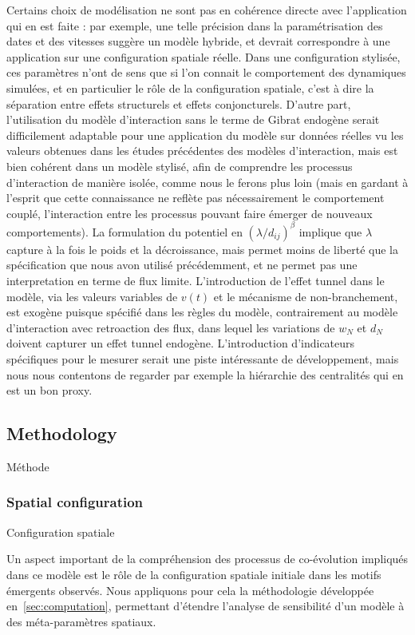 Certains choix de modélisation ne sont pas en cohérence directe avec l'application qui en est faite : par exemple, une telle précision dans la paramétrisation des dates et des vitesses suggère un modèle hybride, et devrait correspondre à une application sur une configuration spatiale réelle. Dans une configuration stylisée, ces paramètres n'ont de sens que si l'on connait le comportement des dynamiques simulées, et en particulier le rôle de la configuration spatiale, c'est à dire la séparation entre effets structurels et effets conjoncturels. D'autre part, l'utilisation du modèle d'interaction sans le terme de Gibrat endogène serait difficilement adaptable pour une application du modèle sur données réelles vu les valeurs obtenues dans les études précédentes des modèles d'interaction, mais est bien cohérent dans un modèle stylisé, afin de comprendre les processus d'interaction de manière isolée, comme nous le ferons plus loin (mais en gardant à l'esprit que cette connaissance ne reflète pas nécessairement le comportement couplé, l'interaction entre les processus pouvant faire émerger de nouveaux comportements). La formulation du potentiel en $(\lambda / d_{ij})^\beta$ implique que $\lambda$ capture à la fois le poids et la décroissance, mais permet moins de liberté que la spécification que nous avon utilisé précédemment, et ne permet pas une interpretation en terme de flux limite. L'introduction de l'effet tunnel dans le modèle, via les valeurs variables de $v(t)$ et le mécanisme de non-branchement, est exogène puisque spécifié dans les règles du modèle, contrairement au modèle d'interaction avec retroaction des flux, dans lequel les variations de $w_N$ et $d_N$ doivent capturer un effet tunnel endogène. L'introduction d'indicateurs spécifiques pour le mesurer serait une piste intéressante de développement, mais nous nous contentons de regarder par exemple la hiérarchie des centralités qui en est un bon proxy.



\subsection{Methodology}{Méthode}

\subsubsection{Spatial configuration}{Configuration spatiale}

Un aspect important de la compréhension des processus de co-évolution impliqués dans ce modèle est le rôle de la configuration spatiale initiale dans les motifs émergents observés. Nous appliquons pour cela la méthodologie développée en~\ref{sec:computation}, permettant d'étendre l'analyse de sensibilité d'un modèle à des méta-paramètres spatiaux.


